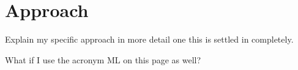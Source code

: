 
\section{Approach}

Explain my specific approach in more detail one this is settled in completely. 

What if I use the acronym \acrshort{ML} on this page as well?



